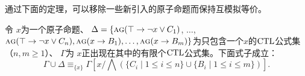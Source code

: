 
通过下面的定理，可以移除一些新引入的原子命题而保持互模拟等价。

\begin{lemma} \label{thm:Aclm}
	令 $x$为一个原子命题、 
	$\Delta = \{\textsc{a}\textsc{g}(\top \rightarrow \neg x \vee C_1)$, $\dots$, $\textsc{a}\textsc{g}(\top \rightarrow \neg x \vee C_n), \textsc{a}\textsc{g}(x \rightarrow B_1), \dots, \textsc{a}\textsc{g}(x \rightarrow B_m)\}$为只包含一个$x$的$\textrm{CTL}$公式集（$n, m \geq 1$）、
	$\Gamma$为 $x$正出现在其中的有限个$\textrm{CTL}$公式集。下面式子成立：
	\begin{equation}\label{eq:Ackermann:lemma}
		\Gamma\cup \Delta \equiv_{\{x\}}  
		\Gamma\left[x/\bigwedge\left(\{C_i\mid 1\le i\le n\}\cup\{B_i\mid 1\le i\le m\}\right)\right].
	\end{equation}
\end{lemma}
